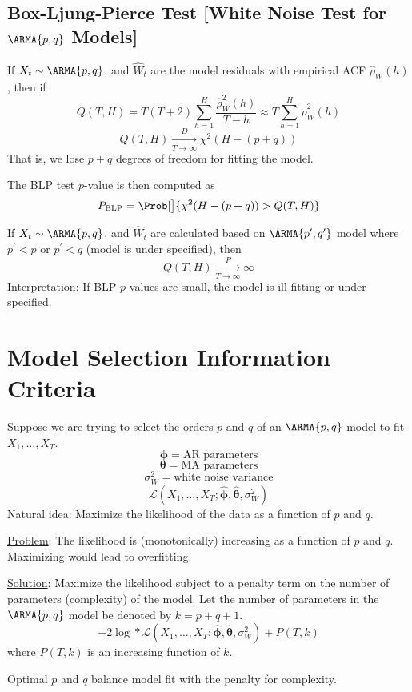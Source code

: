 \subsection*{Box-Ljung-Pierce Test [White Noise Test for $ \ARMA{p,q} $ Models]}
If $ X_t \sim \ARMA{p,q} $, and $ \hat{W}_t $ are the model residuals
with empirical ACF $ \hat{\rho}_W(h) $, then if
\[ Q(T,H)=T(T+2)\sum_{h=1}^{H} \frac{\hat{\rho}_W^2(h)}{T-h}\approx
    T \sum_{h=1}^{H} \hat{\rho}_W^2(h)  \]
\[ Q(T,H)\xrightarrow[T\to\infty]{D}\chi^2(H-(p+q)) \]
That is, we lose $ p+q $ degrees of freedom for fitting the model.

The BLP test $ p $-value is then computed as
\[ P_{\text{BLP}}=\Prob[\big]{\chi^2(H-(p+q))>Q(T,H)} \]

\begin{Remark}{}{}
    If $ X_t \sim \ARMA{p,q} $, and $ \hat{W}_t $
    are calculated based on $ \ARMA{p^\prime,q^\prime} $ model
    where $ p^\prime <p $ or $ p^\prime <q $ (model is under specified),
    then
    \[ Q(T,H)\xrightarrow[T\to\infty]{P}\infty \]
    \underline{Interpretation}: If BLP $ p $-values are small,
    the model is ill-fitting or under specified.
\end{Remark}

\section{Model Selection Information Criteria}
Suppose we are trying to select the orders $ p $ and
$ q $ of an $ \ARMA{p,q} $ model to fit $ X_1,\ldots,X_T $.
\[ \symbf{\phi}=\text{AR parameters} \]
\[ \symbf{\theta}=\text{MA parameters} \]
\[ \sigma_W^2=\text{white noise variance} \]
\[ \mathcal{L}(X_1,\ldots,X_T;\hat{\symbf{\phi}},\hat{\symbf{\theta}},\sigma_W^2) \]
Natural idea: Maximize the likelihood of the data as a function of
$ p $ and $ q $.

\underline{Problem}: The likelihood is (monotonically)
increasing as a function of $ p $ and $ q $. Maximizing would lead
to overfitting.

\underline{Solution}: Maximize the likelihood subject to a
penalty term on the number of parameters (complexity)
of the model. Let the number of parameters
in the $ \ARMA{p,q} $ model be denoted by $ k=p+q+1 $.
\[ -2\log*{\mathcal{L}(X_1,\ldots,X_T;\hat{\symbf{\phi}},\hat{\symbf{\theta}},\sigma_W^2)}+P(T,k) \]
where $ P(T,k) $ is an increasing function of $ k $.

Optimal $ p $ and $ q $ balance model fit with the penalty for complexity.

